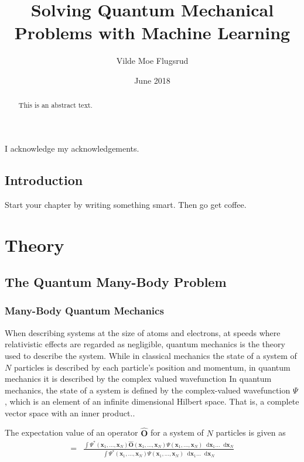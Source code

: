 \documentclass[twoside,english]{uiofysmaster}
\author{Vilde Moe Flugsrud}
\title{Solving Quantum Mechanical Problems with Machine Learning}
\date{June 2018}
\newcommand*\dif{\mathop{}\!\mathrm{d}}
\begin{document}
\maketitle

\begin{abstract}
This is an abstract text.
\end{abstract}

\begin{acknowledgements}
  I acknowledge my acknowledgements.
\end{acknowledgements}

\tableofcontents

\chapter{Introduction}

Start your chapter by writing something smart. Then go get coffee.

\part{Theory}
\chapter{The Quantum Many-Body Problem}

\section{Many-Body Quantum Mechanics}
When describing systems at the size of atoms and electrons, at speeds where relativistic effects are regarded as negligible, quantum mechanics is the theory used to describe the system. 
While in classical mechanics the state of a system of $N$ particles is described by each particle's position and momentum, in quantum mechanics it is described by the complex valued wavefunction 
In quantum mechanics, the state of a system is defined by the complex-valued wavefunction $\Psi$, which is an element of an infinite dimensional Hilbert space. That is, a complete vector space with an inner product.\cite{Kvaal2017}. 

The expectation value of an operator $\hat{\bm{O}}$ for a system of $N$ particles is given as \cite{HjortJensen2015}
\begin{align}
	=& \frac{\int \Psi^{\ast}(\bm{x}_1,...,\bm{x}_N) \hat{\bm{O}}(\bm{x}_1,...,\bm{x}_N)
	\Psi (\bm{x}_1,...,\bm{x}_N)
	\dif \bm{x}_1 ... \dif \bm{x}_N  }
	{\int \Psi^{\ast}(\bm{x}_1,...,\bm{x}_N)
	\Psi (\bm{x}_1,...,\bm{x}_N)
	\dif \bm{x}_1 ... \dif \bm{x}_N}
\end{align}
\end{document}
